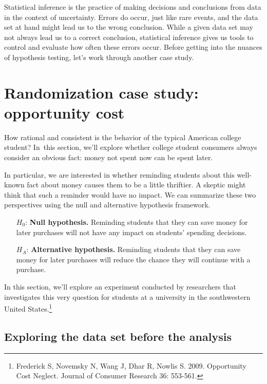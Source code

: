 Statistical inference is the practice of making decisions and conclusions from data in the context of uncertainty. Errors do occur, just like rare events, and the data set at hand might lead us to the wrong conclusion. While a given data set may not always lead us to a correct conclusion, statistical inference gives us tools to control and evaluate how often these errors occur. Before getting into the nuances of hypothesis testing, let's work through another case study.


\section{Randomization case study: opportunity cost}
\label{caseStudyOpportunityCost}

How rational and consistent is the behavior of the typical American college student? In~this section, we'll explore whether college student consumers always consider an obvious fact: money not spent now can be spent later.

In particular, we are interested in whether reminding students about this well-known fact about money causes them to be a little thriftier. A skeptic might think that such a reminder would have no impact. We can summarize these two perspectives using the null and alternative hypothesis framework.
\begin{itemize}
\setlength{\itemsep}{0mm}
\item[$H_0$:] \textbf{Null hypothesis.} Reminding students that they can save money for later purchases will not have any impact on students' spending decisions.
\item[$H_A$:] \textbf{Alternative hypothesis.} Reminding students that they can save money for later purchases will reduce the chance they will continue with a purchase.
\end{itemize}
In this section, we'll explore an experiment conducted by researchers that investigates this very question for students at a university in the southwestern United States.\footnote{Frederick S, Novemsky N, Wang J, Dhar R, Nowlis S. 2009. Opportunity Cost Neglect. Journal of Consumer Research 36: 553-561.}

\subsection{Exploring the data set before the analysis}

